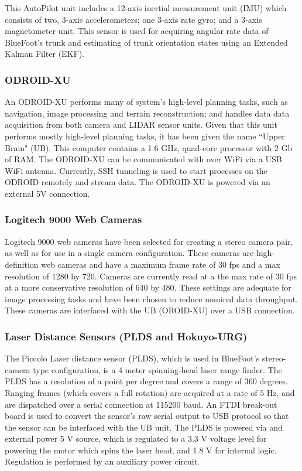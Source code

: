 				This AutoPilot unit includes a 12-axis inertial measurement unit (IMU) which consists of two, 3-axis accelerometers; one 3-axis rate gyro; and a 3-axis magnetometer unit. This sensor is used for acquiring angular rate data of BlueFoot's trunk and estimating of trunk orientation states using an Extended Kalman Filter (EKF). 
				
			\subsubsection{ODROID-XU}

				An ODROID-XU performs many of system's high-level planning tasks, such as navigation, image processing and terrain reconstruction; and handles data data acquisition from both camera and LIDAR sensor units. Given that this unit performs mostly high-level planning tasks, it has been given the name ``Upper Brain" (UB). This computer contains a 1.6 GHz, quad-core processor with 2 Gb of RAM. The ODROID-XU can be communicated with over WiFi via a USB WiFi antenna. Currently, SSH tunneling is used to start processes on the ODROID remotely and stream data. The ODROID-XU is powered via an external 5V connection.

			\subsubsection{Logitech 9000 Web Cameras}

				Logitech 9000 web cameras have been selected for creating a stereo camera pair, as well as for use in a single camera configuration. These cameras are high-definition web cameras and have a maximum frame rate of 30 fps and a max resolution of 1280 by 720. Cameras are currently read at a the max rate of 30 fps at a more conservative resolution of 640 by 480. These settings are adequate for image processing tasks and have been chosen to reduce nominal data throughput. These cameras are interfaced with the UB (OROID-XU) over a USB connection.

			\subsubsection{Laser Distance Sensors (PLDS and Hokuyo-URG)}

				The Piccolo Laser distance sensor (PLDS), which is used in BlueFoot's stereo-camera type configuration, is a 4 meter spinning-head laser range finder. The PLDS has a resolution of a point per degree and covers a range of 360 degrees. Ranging frames (which covers a full rotation) are acquired at a rate of 5 Hz, and are dispatched over a serial connection at 115200 baud. An FTDI break-out board is used to convert the sensor's raw serial output to USB protocol so that the sensor can be interfaced with the UB unit. The PLDS is powered via and external power 5 V source, which is regulated to a 3.3 V voltage level for powering the motor which spins the laser head, and 1.8 V for internal logic. Regulation is performed by an auxiliary power circuit.

